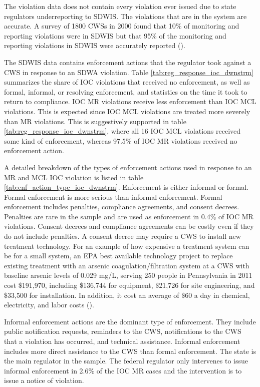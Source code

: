 \documentclass{article}
\begin{document}
The violation data does not contain every violation ever issued due to state regulators underreporting to SDWIS. The violations that are in the system are accurate. A survey of 1800 CWSs in 2000 found that 10\% of monitoring and reporting violations were in SDWIS but that 95\% of the monitoring and reporting violations in SDWIS were accurately reported (\cite{epaviolationreliability}).

The SDWIS data contains enforcement actions that the regulator took against a CWS in response to an SDWA violation. Table \ref{tab:reg_response_ioc_dwnstrm} summarizes the share of IOC violations that received no enforcement, as well as formal, informal, or resolving enforcement, and statistics on the time it took to return to compliance. IOC MR violations receive less enforcement than IOC MCL violations. This is expected since IOC MCL violations are treated more severely than MR violations. This is suggestively supported in table \ref{tab:reg_response_ioc_dwnstrm}, where all 16 IOC MCL violations received some kind of enforcement, whereas 97.5\% of IOC MR violations received no enforcement action. 

A detailed breakdown of the types of enforcement actions used in response to an MR and MCL IOC violation is listed in table \ref{tab:enf_action_type_ioc_dwnstrm}. Enforcement is either informal or formal. Formal enforcement is more serious than informal enforcement. Formal enforcement includes penalties, compliance agreements, and consent decrees. Penalties are rare in the sample and are used as enforcement in 0.4\% of IOC MR violations. Consent decrees and compliance agreements can be costly even if they do not include penalties. A consent decree may require a CWS to install new treatment technology. For an example of how expensive a treatment system can be for a small system, an EPA best available technology project to replace existing treatment with an arsenic coagulation/filtration system at a CWS with baseline arsenic levels of 0.029 mg/L, serving 250 people in Pennsylvania in 2011 cost \$191,970, including \$136,744 for equipment, \$21,726 for site engineering, and \$33,500 for installation. In addition, it cost an average of \$60 a day in chemical, electricity, and labor costs (\cite{epaarsenicbat}).

Informal enforcement actions are the dominant type of enforcement. They include public notification requests, reminders to the CWS, notifications to the CWS that a violation has occurred, and technical assistance. Informal enforcement includes more direct assistance to the CWS than formal enforcement. The state is the main regulator in the sample. The federal regulator only intervenes to issue informal enforcement in 2.6\% of the IOC MR cases and the intervention is to issue a notice of violation. 
\end{document}
